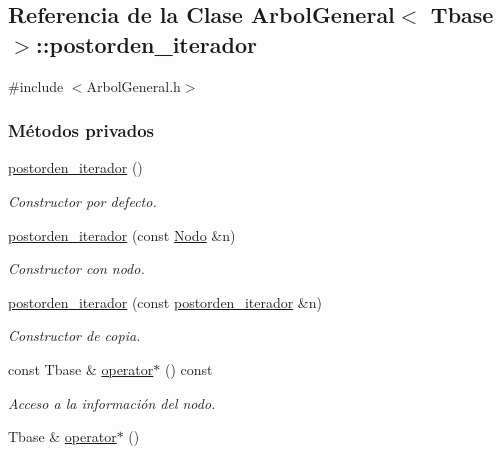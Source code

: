 \hypertarget{classArbolGeneral_1_1postorden__iterador}{\subsection{Referencia de la Clase Arbol\-General$<$ Tbase $>$\-:\-:postorden\-\_\-iterador}
\label{classArbolGeneral_1_1postorden__iterador}
}


{\ttfamily \#include $<$Arbol\-General.\-h$>$}

\subsubsection*{Métodos privados}
\begin{DoxyCompactItemize}
\item 
\hyperlink{classArbolGeneral_1_1postorden__iterador_a2ac2dbbaf71087cf7d5964b45b4bca1e}{postorden\-\_\-iterador} ()
\begin{DoxyCompactList}\small\item\em Constructor por defecto. \end{DoxyCompactList}\item 
\hyperlink{classArbolGeneral_1_1postorden__iterador_a40c1929529a5d1063e97c07a73ecb043}{postorden\-\_\-iterador} (const \hyperlink{classArbolGeneral_a12cc1b74a9095d89bc7334290d332f7a}{Nodo} \&n)
\begin{DoxyCompactList}\small\item\em Constructor con nodo. \end{DoxyCompactList}\item 
\hyperlink{classArbolGeneral_1_1postorden__iterador_a07bc1d0276eb14be207144f0a69745d3}{postorden\-\_\-iterador} (const \hyperlink{classArbolGeneral_1_1postorden__iterador}{postorden\-\_\-iterador} \&n)
\begin{DoxyCompactList}\small\item\em Constructor de copia. \end{DoxyCompactList}\item 
const Tbase \& \hyperlink{classArbolGeneral_1_1postorden__iterador_a7416472d2c6f1ecf02262e79887f38ee}{operator$\ast$} () const 
\begin{DoxyCompactList}\small\item\em Acceso a la información del nodo. \end{DoxyCompactList}\item 
Tbase \& \hyperlink{classArbolGeneral_1_1postorden__iterador_af0f0fcc363dd30b5b0d102c1b60817c3}{operator$\ast$} ()

\end{DoxyCompactItemize}
